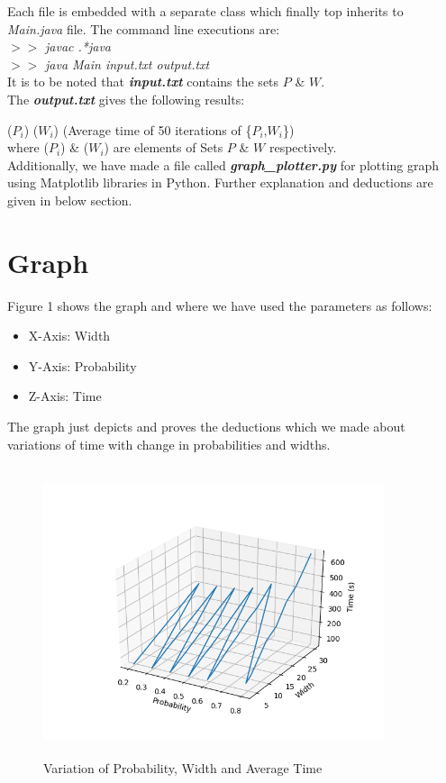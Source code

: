 \documentclass[12pt]{article}
\begin{document}
Each file is embedded with a separate class which finally top inherits to \textit{Main.java} file. The command line executions are: \\
$>>$ \textit{javac .*java} \\
$>>$ \textit{java Main input.txt output.txt} \\ 

It is to be noted that \textbf{\textit{input.txt}} contains the sets $P$ \& $W$.
\\


The \textbf{\textit{output.txt}} gives the following results: 


($P_i$) ($W_i$) (Average time of 50 iterations of \{$P_i$,$W_i$\})
\\
where ($P_i$) \& ($W_i$) are elements of Sets $P$ \& $W$ respectively. \\

Additionally, we have made a file called \textbf{\textit{graph\_plotter.py}} for plotting graph using Matplotlib libraries in Python. Further explanation and deductions are given in below section.

\section{Graph}
Figure 1 shows the graph and where we have used the parameters as follows:
\begin{itemize}
    \item X-Axis: Width
    \item Y-Axis: Probability
    \item Z-Axis: Time
\end{itemize}

The graph just depicts and proves the deductions which we made about variations of time with change in probabilities and widths.
\begin{center}
    \begin{figure}
        \centering
        \includegraphics[width=10cm, height=8.5cm]{graph.png}
        \caption{Variation of Probability, Width and Average Time}
    \end{figure}
\end{center}
\end{document}

